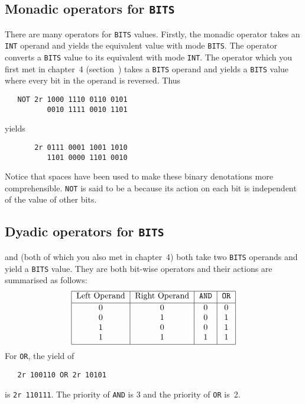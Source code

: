 \subsection*{Monadic operators for \texttt{BITS}}
There are many operators for \verb|BITS| values.  Firstly, the
monadic operator  takes an \verb|INT| operand and yields
the equivalent value with mode \verb|BITS|.  The operator 
converts a \verb|BITS| value to its equivalent with mode \verb|INT|.
The  operator which you first met in chapter~4
(section~) takes a \verb|BITS| operand and yields a
\verb|BITS| value where every bit in the operand is reversed.  Thus
\begin{verbatim}
   NOT 2r 1000 1110 0110 0101
          0010 1111 0010 1101
\end{verbatim}
\noindent
yields
\begin{verbatim}
       2r 0111 0001 1001 1010
          1101 0000 1101 0010
\end{verbatim}
\noindent
Notice that spaces have been used to make these binary denotations
more comprehensible. \verb|NOT| is said to be a  because its action on each bit is independent of the value
of other bits.

\subsection*{Dyadic operators for \texttt{BITS}}
 and  (both of which you also met in chapter~4)
both take two \verb|BITS| operands and yield a \verb|BITS| value.
They are both bit-wise operators and their actions are summarised as
follows:
$$\begin{tabular}{|c|c|c|c|} \hline
Left Operand&Right Operand&\tt AND&\tt OR\\*[2pt] \hline
      0     &       0     &    0  &   0\\*
      0     &       1     &    0  &   1\\*
      1     &       0     &    0  &   1\\*
      1     &       1     &    1  &   1\\*[2pt] \hline
\end{tabular}$$
For \verb|OR|, the yield of
\begin{verbatim}
   2r 100110 OR 2r 10101
\end{verbatim}
\noindent
is \verb|2r 110111|. The priority of \verb|AND| is 3 and the priority
of \verb|OR| is~2.


